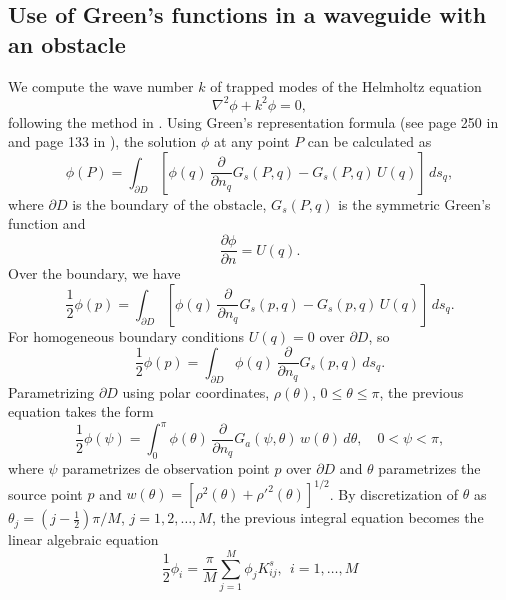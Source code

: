 \documentclass[11pt]{article}
\begin{document}
\subsection{Use of Green's functions in a waveguide with an obstacle}
We compute the wave number $k$ of trapped modes of the Helmholtz equation
\begin{equation}
  \label{eq:16}
  \nabla^2\phi + k^2\phi = 0,
\end{equation}
following the method in \cite{linton1992integral}. Using Green's representation formula (see page 250 in \cite{olver2014introduction} and page 133 in \cite{newman2018marine}), the solution $\phi$ at any point $P$ can be calculated as
\begin{equation}
  \label{eq:18}
\phi(P) = \int_{\partial D} \left[ \phi(q)\, 
\frac{\partial}{\partial n_q} G_s(P,q) 
- G_s(P,q)\, U(q) \right] \, ds_q ,
\end{equation}
where $\partial D$ is the boundary of the obstacle, $G_s(P,q)$ is the symmetric Green's function and
\begin{equation}
  \label{eq:19}
  \frac{\partial\phi}{\partial n} = U(q).
\end{equation}
Over the boundary, we have
\begin{equation}
  \label{eq:20}
  \frac{1}{2}\phi(p) = \int_{\partial D} \left[ \phi(q)\, 
\frac{\partial}{\partial n_q} G_s(p,q) 
- G_s(p,q)\, U(q) \right] \, ds_q.
\end{equation}
For homogeneous boundary conditions $U(q)=0$ over $\partial D$, so
\begin{equation}
  \label{eq:21}
  \frac{1}{2}\phi(p) = \int_{\partial D} \phi(q)\, 
\frac{\partial}{\partial n_q} G_s(p,q)  \, ds_q.  
\end{equation}
Parametrizing $\partial D$ using polar coordinates, $\rho(\theta)$, $0 \le \theta \le \pi$, the previous equation takes the form
\begin{equation}
  \label{eq:22}
  \frac{1}{2}\phi(\psi) = \int_{0}^{\pi} 
\phi(\theta) \, \frac{\partial}{\partial n_q} 
G_a(\psi,\theta)\, w(\theta) \, d\theta, 
\quad 0 < \psi < \pi ,
\end{equation}
where $\psi$ parametrizes de observation point $p$ over $\partial D$ and $\theta$ parametrizes the source point $p$ and $w(\theta) = [\rho^2(\theta) + \rho'^2(\theta)]^{1/2}$. By discretization of $\theta$ as $\theta_j = (j-\frac{1}{2})\pi/M$, $j=1,2,\ldots,M$, the previous integral equation becomes the linear algebraic equation
\begin{equation}
  \label{eq:23}
  \frac{1}{2} \phi_i = \frac{\pi}{M}\sum_{j=1}^M \phi_j K_{ij}^s,~~i=1,\ldots,M
\end{equation}
\end{document}

